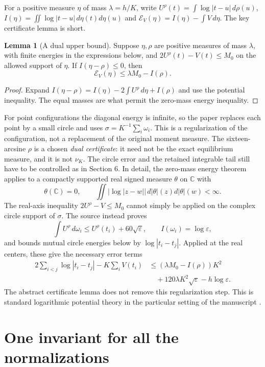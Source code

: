 \documentclass[11pt]{article}
\theoremstyle{definition}
\newtheorem{lemma}[proposition]{Lemma}
\theoremstyle{remark}\newtheorem*{remark}{Remark}
\newcommand{\C}{\mathbb C}
\begin{document}
For a positive measure $\eta$ of mass $\lambda=h/K$, write
$U^\rho(t)=\int\log|t-u|\,d\rho(u)$,
$I(\eta)=\iint\log|t-u|\,d\eta(t)d\eta(u)$ and
$\mathcal E_V(\eta)=I(\eta)-\int V\,d\eta$.
The key certificate lemma is short.
\begin{lemma}[A dual upper bound]\label{lem:energy}
Suppose $\eta,\rho$ are positive measures of mass $\lambda$, with finite energies
in the expressions below, and
$2U^\rho(t)-V(t)\le M_0$ on the allowed support of $\eta$.
If $I(\eta-\rho)\le0$, then
\[
 \mathcal E_V(\eta)\le\lambda M_0-I(\rho).
\]
\end{lemma}
\begin{proof}
Expand
$I(\eta-\rho)=I(\eta)-2\int U^\rho\,d\eta+I(\rho)$ and use the potential
inequality. The equal masses are what permit the zero-mass energy inequality.
\end{proof}
For point configurations the diagonal energy is infinite, so the paper replaces
each point by a small circle and uses
$\sigma=K^{-1}\sum_i\omega_i$. This is a regularization of the configuration,
not a replacement of the original moment measure. The sixteen-arcsine $\rho$
is a chosen \emph{dual certificate}: it need not be the exact equilibrium
measure, and it is not $\nu_K$. The circle error and the retained integrable
tail still have to be controlled as in Section 6. In detail, the zero-mass
energy theorem applies to a compactly supported real signed measure $\theta$
on $\C$ with
\[
 \theta(\C)=0,\qquad
 \iint\bigl|\log|z-w|\bigr|\,d|\theta|(z)d|\theta|(w)<\infty.
\]
The real-axis inequality $2U^\rho-V\le M_0$ cannot simply be applied on the
complex circle support of $\sigma$. The source instead proves
\[
 \int U^\rho\,d\omega_i\le U^\rho(t_i)+60\sqrt\varepsilon,
 \qquad I(\omega_i)=\log\varepsilon,
\]
and bounds mutual circle energies below by $\log|t_i-t_j|$. Applied at the
real centers, these give the necessary error terms
\begin{align*}
 2\sum_{i<j}\log|t_i-t_j|-K\sum_iV(t_i)
 &\le (\lambda M_0-I(\rho))K^2\\
 &\quad+120\lambda K^2\sqrt\varepsilon-h\log\varepsilon.
\end{align*}
The abstract certificate lemma does not remove this regularization step.
This is standard logarithmic
potential theory in the particular setting of the manuscript \cite{Saff}.

\section{One invariant for all the normalizations}
\end{document}
